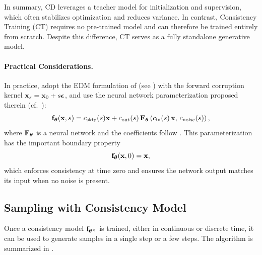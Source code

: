 In summary, CD leverages a teacher model for initialization and supervision, which often stabilizes optimization and reduces variance.  In contrast, Consistency Training (CT) requires no pre-trained model and can therefore be trained entirely from scratch.
Despite this difference, CT serves as a fully standalone generative model.
\paragraph{Practical Considerations.}
In practice, \citet{song2023consistency} adopt the EDM formulation
of \citet{karras2022elucidating} (see ) with the forward corruption
kernel $    {\mathbf{x}}_s = {\mathbf{x}}_0 + s \bm{\epsilon}$, and use the neural network parameterization proposed therein
(cf.\ ):
\[
    {\mathbf{f}}_{\bm{\theta}}({\mathbf{x}}, s)
    = c_{\mathrm{skip}}(s) {\mathbf{x}}
      + c_{\mathrm{out}}(s)\,
        {\mathbf{F}}_{\bm{\theta}} \left(c_{\mathrm{in}}(s)\,{\mathbf{x}},\, c_{\mathrm{noise}}(s)\right),
\]
where ${\mathbf{F}}_{\bm{\theta}}$ is a neural network and the coefficients follow
. This parameterization has the important
boundary property
\[
    {\mathbf{f}}_{\bm{\theta}}({\mathbf{x}}, 0) = {\mathbf{x}},
\]
which enforces consistency at time zero and ensures the network output matches
its input when no noise is present.






\subsection{Sampling with Consistency Model}\label{subsec:cm-sampling}
Once a consistency model ${\mathbf{f}}_{\bm{\theta}^\times}$ is trained, either in continuous or discrete time, it can be used to generate samples in a single step or a few steps. The algorithm is summarized in .

